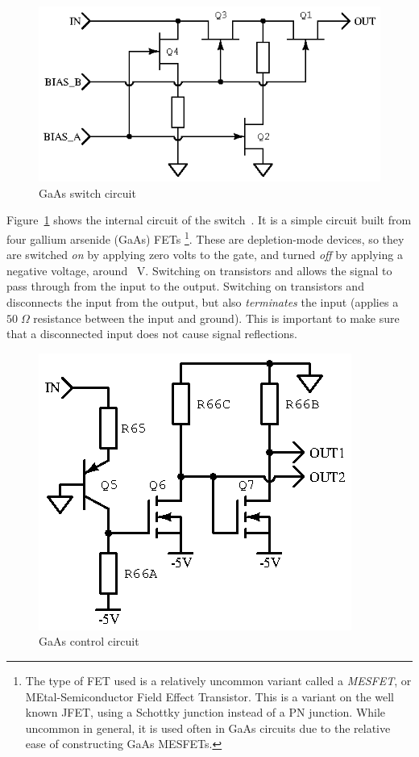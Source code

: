\begin{figure}[H]
\centering
\includegraphics{gaassw}
\caption{GaAs switch circuit}
\label{fig:gaassw}
\end{figure}

Figure~\ref{fig:gaassw} shows the internal circuit of the
switch~\cite{maswss0162}.  It is a simple circuit built from four gallium
arsenide (GaAs) FETs \footnote{The type of FET used is a relatively uncommon
    variant called a \emph{MESFET}, or MEtal-Semiconductor Field Effect
Transistor. This is a variant on the well known JFET, using a Schottky junction
instead of a PN junction. While uncommon in general, it is used often in GaAs
circuits due to the relative ease of constructing GaAs MESFETs.}.  These are
depletion-mode devices, so they are switched \emph{on} by applying zero volts
to the gate, and turned \emph{off} by applying a negative voltage, around
~V.  Switching on transistors  and  allows the
signal to pass through from the input to the output. Switching on transistors
 and  disconnects the input from the output, but also
\emph{terminates} the input (applies a $50\;\Omega$ resistance between the
input and ground). This is important to make sure that a disconnected input
does not cause signal reflections.

\begin{figure}[H]
\centering
\includegraphics{gaasctl}
\caption{GaAs control circuit}
\label{fig:gaasctl}
\end{figure}

